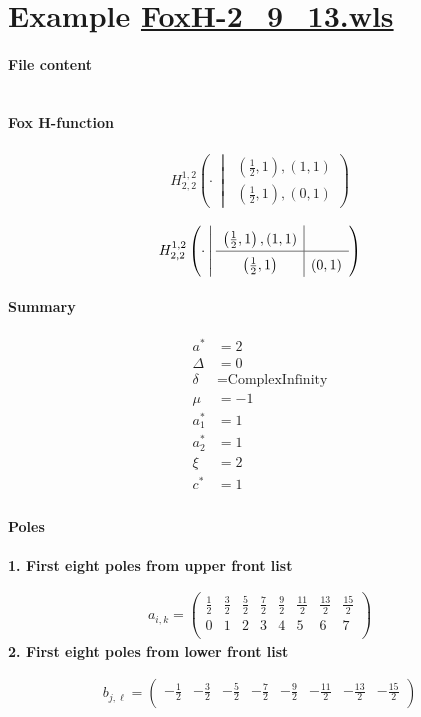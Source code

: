 \documentclass[11pt]{article}
\newcommand{\FoxH}[5]{H_{#2}^{#1}\left(#3\:\middle\vert\: \begin{array}{l}#4\\[0.4em] #5\end{array}\right)}
\begin{document}
\section{Example \url{FoxH-2_9_13.wls}}

\paragraph{File content}

\inputminted{text}{FoxH-2_9_13.wls}

\paragraph{Fox H-function}

\begin{align*}
  \FoxH
    {1,2}
    {2,2}
    {\cdot}
    {\left(\frac{1}{2}, 1\right), \left(1, 1\right)}
    {\left(\frac{1}{2}, 1\right), \left(0, 1\right)}
\end{align*}

\begin{align*}
  \FoxHext
    {1,2}
    {2,2}
    {\cdot}
    {\left(\frac{1}{2}, 1\right), \left(1, 1\right)}
    {}
    {\left(\frac{1}{2}, 1\right)}
    {\left(0, 1\right)}
\end{align*}

\paragraph{Summary}

\begin{align*}
  a^*    & = 2 \\
  \Delta & = 0 \\
  \delta & = \text{ComplexInfinity} \\
  \mu    & = -1 \\
  a_1^*  & = 1 \\
  a_2^*  & = 1 \\
  \xi    & = 2 \\
  c^*    & = 1 \\
\end{align*}

\paragraph{Poles}

\noindent\textbf{1. First eight poles from upper front list}

\begin{align*}
  a_{i,k} = 
  \left(
\begin{array}{cccccccc}
 \frac{1}{2} & \frac{3}{2} & \frac{5}{2} & \frac{7}{2} & \frac{9}{2} & \frac{11}{2} & \frac{13}{2} & \frac{15}{2} \\
 0 & 1 & 2 & 3 & 4 & 5 & 6 & 7 \\
\end{array}
\right)
\end{align*}
\noindent\textbf{2. First eight poles from lower front list}

\begin{align*}
  b_{j,\ell} = 
  \left(
\begin{array}{cccccccc}
 -\frac{1}{2} & -\frac{3}{2} & -\frac{5}{2} & -\frac{7}{2} & -\frac{9}{2} & -\frac{11}{2} & -\frac{13}{2} & -\frac{15}{2} \\
\end{array}
\right)
\end{align*}

\printbibliography[title={References}]
\end{document}
